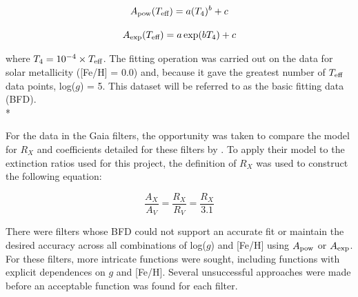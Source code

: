 \documentclass[12pt, a4paper]{report}
\begin{document}
\begin{equation}
A_{\textnormal{pow}} (T_{\textnormal{eff}}) = a (T_{4})^{b} + c
\label{Teff_pow}
\end{equation}

\begin{equation}
A_{\textnormal{exp}} (T_{\textnormal{eff}}) = a \exp(b T_{4}) + c
\label{Teff_exp}
\end{equation}

where $T_{4} = 10^{-4} \times T_{\textnormal{eff}}$. The fitting operation was carried out on the data for solar metallicity ([Fe/H] = 0.0) and, because it gave the greatest number of $T_{\textnormal{eff}}$ data points, log($g$) = 5. This dataset will be referred to as the basic fitting data (BFD).\\*

For the data in the Gaia filters, the opportunity was taken to compare the model for $R_{X}$ and coefficients detailed for these filters by \cite{2018MNRAS.479L.102C}. To apply their model to the extinction ratios used for this project, the definition of $R_{X}$ was used to construct the following equation:

\begin{equation}
\frac{A_{X}}{A_{V}} = \frac{R_{X}}{R_{V}} = \frac{R_{X}}{3.1}
\label{convert_Rx_to_Ax}
\end{equation}

There were filters whose BFD could not support an accurate fit or maintain the desired accuracy across all combinations of log($g$) and [Fe/H] using $A_{\textnormal{pow}}$ or $A_{\textnormal{exp}}$. For these filters, more intricate functions were sought, including functions with explicit dependences on $g$ and [Fe/H]. Several unsuccessful approaches were made before an acceptable function was found for each filter.

\end{document}
